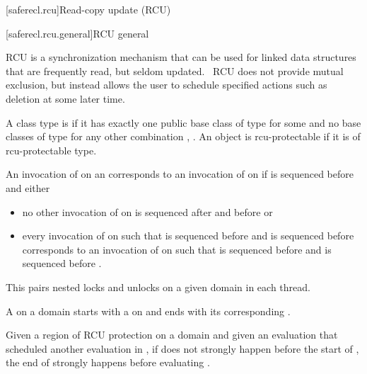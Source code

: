 
[saferecl.rcu]{Read-copy update (RCU)}

[saferecl.rcu.general]{RCU general}

\pnum
RCU is a synchronization mechanism that can be used for linked data
structures that are frequently read, but seldom updated.  RCU does
not provide mutual exclusion, but instead allows the user to schedule
specified actions such as deletion at some later time.

\pnum
A class type  is  if it has exactly one
public base class of type  for some 
and no base classes of type  for any other
combination , . An object is rcu-protectable if it is
of rcu-protectable type.

\pnum
An invocation of  on an  corresponds
to an invocation of  on  if  is
sequenced before  and either

\begin{itemize}
\item	no other invocation of  on  is sequenced
	after  and before  or
\item	every invocation of  on  such
	that  is sequenced before  and 
	is sequenced before  corresponds to an invocation of
	 on  such that  is sequenced
	before  and  is sequenced before .
\end{itemize}


\pnum
\begin{note}
This pairs nested locks and unlocks on a given domain in each thread.
\end{note}

\pnum
A  on a domain  starts
with a  on  and ends with its corresponding
.

\pnum
Given a region of RCU protection  on a domain 
and given an evaluation  that scheduled another evaluation
 in , if  does not strongly happen before
the start of , the end of  strongly happens before
evaluating .

